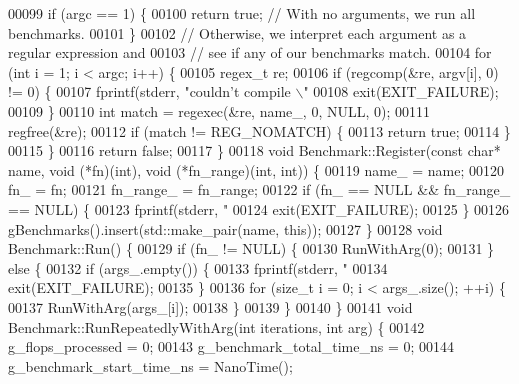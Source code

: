 \begin{DoxyCode}
00099   \textcolor{keywordflow}{if} (argc == 1) \{
00100     \textcolor{keywordflow}{return} \textcolor{keyword}{true};  \textcolor{comment}{// With no arguments, we run all benchmarks.}
00101   \}
00102   \textcolor{comment}{// Otherwise, we interpret each argument as a regular expression and}
00103   \textcolor{comment}{// see if any of our benchmarks match.}
00104   \textcolor{keywordflow}{for} (\textcolor{keywordtype}{int} i = 1; i < argc; i++) \{
00105     regex\_t re;
00106     \textcolor{keywordflow}{if} (regcomp(&re, argv[i], 0) != 0) \{
00107       fprintf(stderr, \textcolor{stringliteral}{"couldn't compile \(\backslash\)"%
00108       exit(EXIT\_FAILURE);
00109     \}
00110     \textcolor{keywordtype}{int} match = regexec(&re, name\_, 0, NULL, 0);
00111     regfree(&re);
00112     \textcolor{keywordflow}{if} (match != REG\_NOMATCH) \{
00113       \textcolor{keywordflow}{return} \textcolor{keyword}{true};
00114     \}
00115   \}
00116   \textcolor{keywordflow}{return} \textcolor{keyword}{false};
00117 \}
00118 \textcolor{keywordtype}{void} Benchmark::Register(\textcolor{keyword}{const} \textcolor{keywordtype}{char}* name, \textcolor{keywordtype}{void} (*fn)(\textcolor{keywordtype}{int}), \textcolor{keywordtype}{void} (*fn\_range)(\textcolor{keywordtype}{int}, \textcolor{keywordtype}{int})) \{
00119   name\_ = name;
00120   fn\_ = fn;
00121   fn\_range\_ = fn\_range;
00122   \textcolor{keywordflow}{if} (fn\_ == NULL && fn\_range\_ == NULL) \{
00123     fprintf(stderr, \textcolor{stringliteral}{"%
00124     exit(EXIT\_FAILURE);
00125   \}
00126   gBenchmarks().insert(std::make\_pair(name, \textcolor{keyword}{this}));
00127 \}
00128 \textcolor{keywordtype}{void} Benchmark::Run() \{
00129   \textcolor{keywordflow}{if} (fn\_ != NULL) \{
00130     RunWithArg(0);
00131   \} \textcolor{keywordflow}{else} \{
00132     \textcolor{keywordflow}{if} (args\_.empty()) \{
00133       fprintf(stderr, \textcolor{stringliteral}{"%
00134       exit(EXIT\_FAILURE);
00135     \}
00136     \textcolor{keywordflow}{for} (\textcolor{keywordtype}{size\_t} i = 0; i < args\_.size(); ++i) \{
00137       RunWithArg(args\_[i]);
00138     \}
00139   \}
00140 \}
00141 \textcolor{keywordtype}{void} Benchmark::RunRepeatedlyWithArg(\textcolor{keywordtype}{int} iterations, \textcolor{keywordtype}{int} arg) \{
00142   g\_flops\_processed = 0;
00143   g\_benchmark\_total\_time\_ns = 0;
00144   g\_benchmark\_start\_time\_ns = NanoTime();
}}}
\end{DoxyCode}
